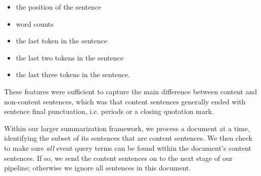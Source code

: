\begin{itemize}
 \item the position of the sentence
 \item word counts
 \item the last token in the sentence
 \item the last two tokens in the sentence
 \item the last three tokens in the sentence.
\end{itemize} 

These features were sufficient to capture 
the main difference between content and non-content sentences,
which 
was that content sentences generally ended with sentence final punctuation, 
i.e. periods or a closing quotation mark. 

Within our larger summarization framework, we process a document at a time,
identifying the subset of its sentences that are content sentences.
We then check to make sure \emph{all} event
query terms can be found within the document's content sentences. If so,
we send the content sentences on to the next stage of our pipeline; otherwise
we ignore all sentences in this document.

